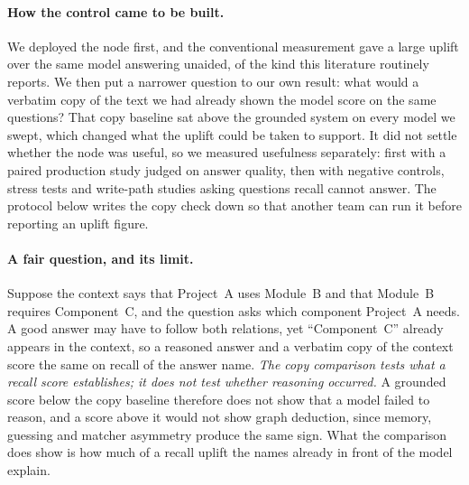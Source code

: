 \documentclass[10pt,twocolumn]{article}
\begin{document}
\paragraph{How the control came to be built.} We deployed the node first, and the conventional measurement gave a large uplift over the same model answering unaided, of the kind this literature routinely reports. We then put a narrower question to our own result: what would a verbatim copy of the text we had already shown the model score on the same questions? That copy baseline sat above the grounded system on every model we swept, which changed what the uplift could be taken to support. It did not settle whether the node was useful, so we measured usefulness separately: first with a paired production study judged on answer quality, then with negative controls, stress tests and write-path studies asking questions recall cannot answer. The protocol below writes the copy check down so that another team can run it before reporting an uplift figure.

\paragraph{A fair question, and its limit.} Suppose the context says that Project~A uses Module~B and that Module~B requires Component~C, and the question asks which component Project~A needs. A good answer may have to follow both relations, yet ``Component~C'' already appears in the context, so a reasoned answer and a verbatim copy of the context score the same on recall of the answer name. \emph{The copy comparison tests what a recall score establishes; it does not test whether reasoning occurred.} A grounded score below the copy baseline therefore does not show that a model failed to reason, and a score above it would not show graph deduction, since memory, guessing and matcher asymmetry produce the same sign. What the comparison does show is how much of a recall uplift the names already in front of the model explain.
\end{document}
